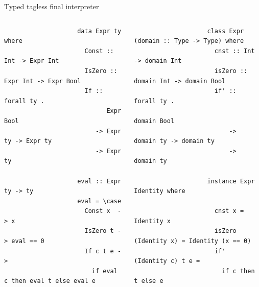     \begin{frame}[fragile]{Typed tagless final interpreter}
        \vspace{-1em}
        \begin{columns}[onlytextwidth]
            \begin{column}[t]{0.485\textwidth}
                \begin{verbatim}
                    data Expr ty where
                      Const :: Int -> Expr Int
                      IsZero :: Expr Int -> Expr Bool
                      If :: forall ty .
                            Expr Bool
                         -> Expr ty -> Expr ty
                         -> Expr ty

                    eval :: Expr ty -> ty
                    eval = \case
                      Const x  -> x
                      IsZero t -> eval == 0
                      If c t e ->
                        if eval c then eval t else eval e
                \end{verbatim}
            \end{column}\hfill%
            \begin{column}[t]{0.495\textwidth}
                \begin{verbatim}
                    class Expr (domain :: Type -> Type) where
                      cnst :: Int -> domain Int
                      isZero :: domain Int -> domain Bool
                      if' :: forall ty .
                             domain Bool
                          -> domain ty -> domain ty
                          -> domain ty

                    instance Expr Identity where

                      cnst x = Identity x
                      isZero (Identity x) = Identity (x == 0)
                      if' (Identity c) t e =
                        if c then t else e
                \end{verbatim}
            \end{column}
        \end{columns}
    \end{frame}

